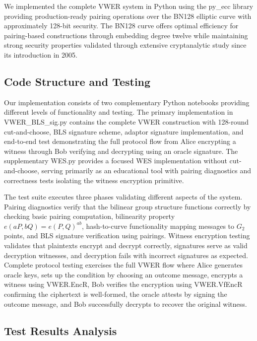 \documentclass[11pt,a4paper]{article}
\begin{document}
{We implemented the complete VWER system in Python using the py\_ecc library providing production-ready pairing operations over the BN128 elliptic curve with approximately 128-bit security. The BN128 curve offers optimal efficiency for pairing-based constructions through embedding degree twelve while maintaining strong security properties validated through extensive cryptanalytic study since its introduction in 2005.

\subsection{Code Structure and Testing}

Our implementation consists of two complementary Python notebooks providing different levels of functionality and testing. The primary implementation in VWER\_BLS\_sig.py contains the complete VWER construction with 128-round cut-and-choose, BLS signature scheme, adaptor signature implementation, and end-to-end test demonstrating the full protocol flow from Alice encrypting a witness through Bob verifying and decrypting using an oracle signature. The supplementary WES.py provides a focused WES implementation without cut-and-choose, serving primarily as an educational tool with pairing diagnostics and correctness tests isolating the witness encryption primitive.

The test suite executes three phases validating different aspects of the system. Pairing diagnostics verify that the bilinear group structure functions correctly by checking basic pairing computation, bilinearity property $e(aP, bQ) = e(P, Q)^{ab}$, hash-to-curve functionality mapping messages to $G_2$ points, and BLS signature verification using pairings. Witness encryption testing validates that plaintexts encrypt and decrypt correctly, signatures serve as valid decryption witnesses, and decryption fails with incorrect signatures as expected. Complete protocol testing exercises the full VWER flow where Alice generates oracle keys, sets up the condition by choosing an outcome message, encrypts a witness using VWER.EncR, Bob verifies the encryption using VWER.VfEncR confirming the ciphertext is well-formed, the oracle attests by signing the outcome message, and Bob successfully decrypts to recover the original witness.

\subsection{Test Results Analysis}

}
\end{document}
